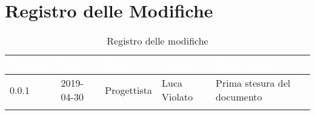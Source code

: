 \newpage

\section*{Registro delle Modifiche}

\begin{center}
\begin{longtable}[c]{|m{}|m{}|m{}|m{}|p{}|}
\hline
\rowcolor{bluelogo}\textbf{\textcolor{white}{Versione}} & \textbf{\textcolor{white}{Data}} & \textbf{\textcolor{white}{Ruolo}} & \textbf{\textcolor{white}{Autore}} & \textbf{\textcolor{white}{Descrizione}}\\
\endfirsthead
\hline \hline
0.0.1 & 2019-04-30 & Progettista & Luca Violato & Prima stesura del documento\\
\hline
\caption{Registro delle modifiche}
\end{longtable}
\end{center}
